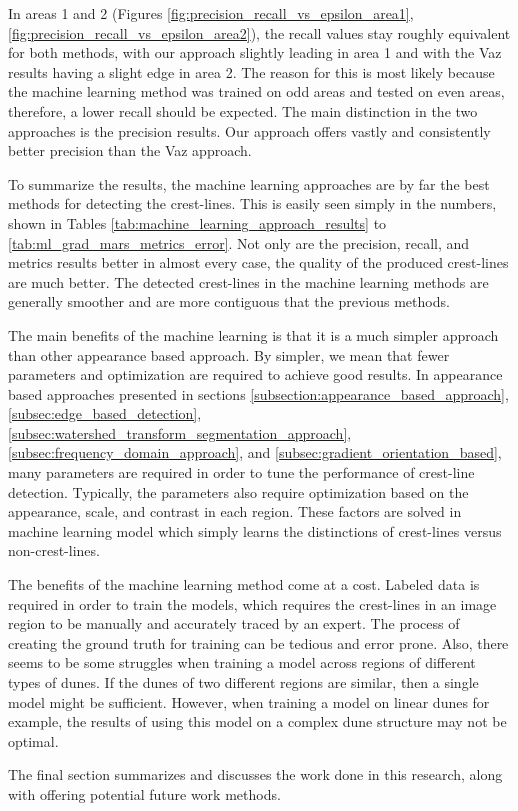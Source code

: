 In areas 1 and 2 (Figures \ref{fig:precision_recall_vs_epsilon_area1}, \ref{fig:precision_recall_vs_epsilon_area2}), the recall values stay roughly equivalent for both methods, with our approach slightly leading in area 1 and with the Vaz results having a slight edge in area 2. The reason for this is most likely because the machine learning method was trained on odd areas and tested on even areas, therefore, a lower recall should be expected. The main distinction in the two approaches is the precision results. Our approach offers vastly and consistently better precision than the Vaz approach.

To summarize the results, the machine learning approaches are by far the best methods for detecting the crest-lines. This is easily seen simply in the numbers, shown in Tables \ref{tab:machine_learning_approach_results} to \ref{tab:ml_grad_mars_metrics_error}. Not only are the precision, recall, and metrics results better in almost every case, the quality of the produced crest-lines are much better. The detected crest-lines in the machine learning methods are generally smoother and are more contiguous that the previous methods.

The main benefits of the machine learning is that it is a much simpler approach than other appearance based approach. By simpler, we mean that fewer parameters and optimization are required to achieve good results. In appearance based approaches presented in sections \ref{subsection:appearance_based_approach}, \ref{subsec:edge_based_detection}, \ref{subsec:watershed_transform_segmentation_approach}, \ref{subsec:frequency_domain_approach}, and \ref{subsec:gradient_orientation_based}, many parameters are required in order to tune the performance of crest-line detection. Typically, the parameters also require optimization based on the appearance, scale, and contrast in each region. These factors are solved in machine learning model which simply learns the distinctions of crest-lines versus non-crest-lines.

The benefits of the machine learning method come at a cost. Labeled data is required in order to train the models, which requires the crest-lines in an image region to be manually and accurately traced by an expert. The process of creating the ground truth for training can be tedious and error prone. Also, there seems to be some struggles when training a model across regions of different types of dunes. If the dunes of two different regions are similar, then a single model might be sufficient. However, when training a model on linear dunes for example, the results of using this model on a complex dune structure may not be optimal.

The final section summarizes and discusses the work done in this research, along with offering potential future work methods. 